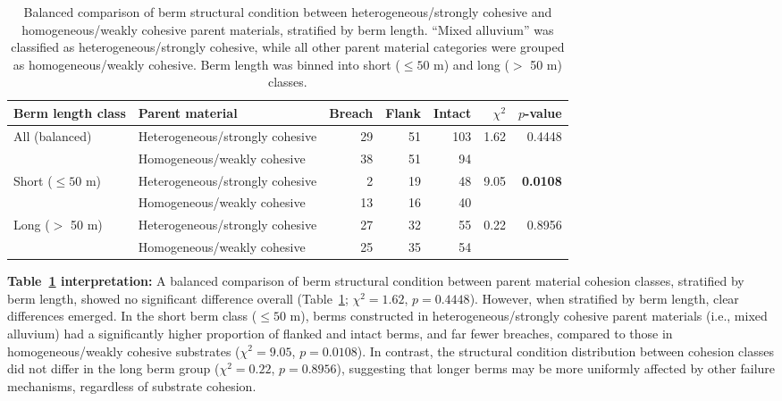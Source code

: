 \documentclass[review]{elsarticle}
\begin{document}
\begin{table}[h!]
\centering
\caption{\normalsize Balanced comparison of berm structural condition between heterogeneous/strongly cohesive and homogeneous/weakly cohesive parent materials, stratified by berm length. ``Mixed alluvium'' was classified as heterogeneous/strongly cohesive, while all other parent material categories were grouped as homogeneous/weakly cohesive. Berm length was binned into short ($\leq 50$ m) and long ($>$ 50 m) classes.}
\small
\begin{tabular}{|l|l|r|r|r|r|r|}
\hline
\textbf{Berm length class} & \textbf{Parent material} & \textbf{Breach} & \textbf{Flank} & \textbf{Intact} & \textbf{$\chi^2$} & \textbf{$p$-value} \\
\hline
\multirow{2}{*}{All (balanced)} & Heterogeneous/strongly cohesive & 29 & 51 & 103 & \multirow{2}{*}{1.62} & \multirow{2}{*}{0.4448} \\
& Homogeneous/weakly cohesive & 38 & 51 & 94 & & \\
\hline
\multirow{2}{*}{Short ($\leq 50$ m)} & Heterogeneous/strongly cohesive & 2 & 19 & 48 & \multirow{2}{*}{9.05} & \multirow{2}{*}{\textbf{0.0108}} \\
& Homogeneous/weakly cohesive & 13 & 16 & 40 & & \\
\hline
\multirow{2}{*}{Long ($>$ 50 m)} & Heterogeneous/strongly cohesive & 27 & 32 & 55 & \multirow{2}{*}{0.22} & \multirow{2}{*}{0.8956} \\
& Homogeneous/weakly cohesive & 25 & 35 & 54 & & \\
\hline
\end{tabular}
\label{tab:parentmat_length_chi}
\end{table}

\textbf{Table~\ref{tab:parentmat_length_chi} interpretation:} A balanced comparison of berm structural condition between parent material cohesion classes, stratified by berm length, showed no significant difference overall (Table~\ref{tab:parentmat_length_chi}; $\chi^2 = 1.62$, $p = 0.4448$). However, when stratified by berm length, clear differences emerged. In the short berm class ($\leq 50$ m), berms constructed in heterogeneous/strongly cohesive parent materials (i.e., mixed alluvium) had a significantly higher proportion of flanked and intact berms, and far fewer breaches, compared to those in homogeneous/weakly cohesive substrates ($\chi^2 = 9.05$, $p = 0.0108$). In contrast, the structural condition distribution between cohesion classes did not differ in the long berm group ($\chi^2 = 0.22$, $p = 0.8956$), suggesting that longer berms may be more uniformly affected by other failure mechanisms, regardless of substrate cohesion.
\end{document}
